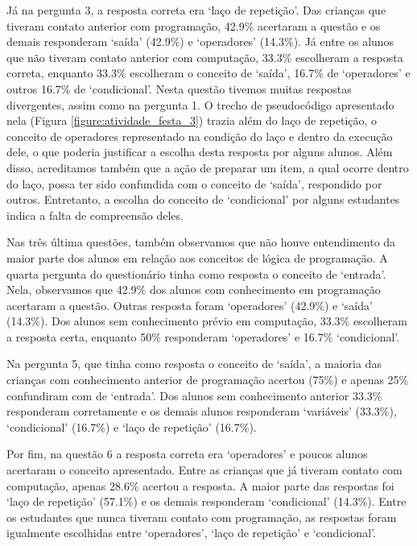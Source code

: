 Já na pergunta 3, a resposta correta era \enquote*{laço de repetição}. Das crianças que tiveram contato anterior com programação, 42.9\% acertaram a questão e os demais responderam \enquote*{saída} (42.9\%) e \enquote*{operadores} (14.3\%). Já entre os alunos que não tiveram contato anterior com computação, 33.3\% escolheram a resposta correta, enquanto 33.3\% escolheram o conceito de \enquote*{saída}, 16.7\% de \enquote*{operadores} e outros 16.7\% de \enquote*{condicional}. Nesta questão tivemos muitas respostas divergentes, assim como na pergunta 1. O trecho de pseudocódigo apresentado nela (Figura \ref{figure:atividade_festa_3}) trazia além do laço de repetição, o conceito de operadores representado na condição do laço e dentro da execução dele, o que poderia justificar a escolha desta resposta por alguns alunos. Além disso, acreditamos também que a ação de preparar um item, a qual ocorre dentro do laço, possa ter sido confundida com o conceito de \enquote*{saída}, respondido por outros. Entretanto, a escolha do conceito de \enquote*{condicional} por alguns estudantes indica a falta de compreensão deles.

Nas três última questões, também observamos que não houve entendimento da maior parte dos alunos em relação aos conceitos de lógica de programação. A quarta pergunta do questionário tinha como resposta o conceito de \enquote*{entrada}. Nela, observamos que 42.9\% dos alunos com conhecimento em programação acertaram a questão. Outras resposta foram \enquote*{operadores} (42.9\%) e \enquote*{saída} (14.3\%). Dos alunos sem conhecimento prévio em computação, 33.3\% escolheram a resposta certa, enquanto 50\% responderam \enquote*{operadores} e 16.7\% \enquote*{condicional}. 

Na pergunta 5, que tinha como resposta o conceito de \enquote*{saída}, a maioria das crianças com conhecimento anterior de programação acertou (75\%) e apenas 25\% confundiram com de \enquote*{entrada}. Dos alunos sem conhecimento anterior 33.3\% responderam corretamente e os demais alunos responderam \enquote*{variáveis} (33.3\%), \enquote*{condicional} (16.7\%) e \enquote*{laço de repetição} (16.7\%).

Por fim, na questão 6 a resposta correta era \enquote*{operadores} e poucos alunos acertaram o conceito apresentado. Entre as crianças que já tiveram contato com computação, apenas 28.6\% acertou a resposta. A maior parte das respostas foi \enquote*{laço de repetição} (57.1\%) e os demais responderam \enquote*{condicional} (14.3\%). Entre os estudantes que nunca tiveram contato com programação, as respostas foram igualmente escolhidas entre \enquote*{operadores}, \enquote*{laço de repetição} e \enquote*{condicional}.

